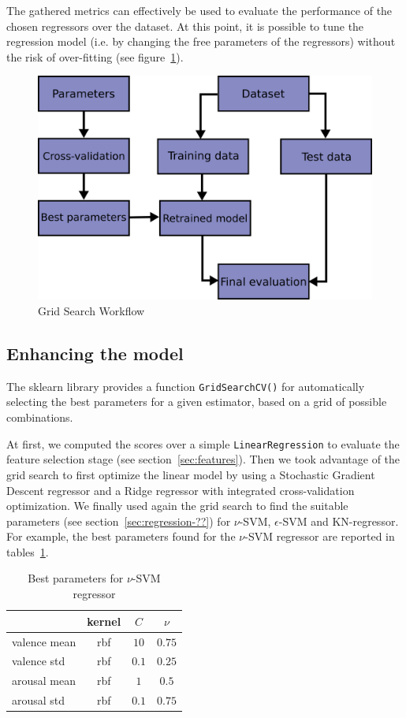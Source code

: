 The gathered metrics can effectively be used to evaluate the performance of the chosen regressors over the dataset.
At this point, it is possible to tune the regression model (i.e. by changing the free parameters of the regressors) without the risk of over-fitting (see figure~\ref{fig:grid-search-workflow}).

\begin{figure}
	\centering
	\includegraphics[width=0.5\linewidth]{assets/grid_search_workflow.png}
	\caption{Grid Search Workflow \cite{sklearn-crossval}}
	\label{fig:grid-search-workflow}
\end{figure}


\subsection{Enhancing the model}\label{sec:enhance-model}

The sklearn library provides a function \texttt{GridSearchCV()} for automatically selecting the best parameters for a given estimator, based on a grid of possible combinations.

At first, we computed the scores over a simple \texttt{LinearRegression} to evaluate the feature selection stage (see section~\ref{sec:features}).
Then we took advantage of the grid search to first optimize the linear model by using a Stochastic Gradient Descent regressor and a Ridge regressor with integrated cross-validation optimization.
We finally used again the grid search to find the suitable parameters (see section~\ref{sec:regression-??}) for $\nu$-SVM, $\epsilon$-SVM and KN-regressor.
For example, the best parameters found for the $\nu$-SVM regressor are reported in tables~\ref{table:cross-params-svr}.

\begin{table}
	\centering
	\begin{tabular}{lccc}
		\toprule
		& kernel & $C$ & $\nu$ \\
		\midrule
		valence mean & rbf & $10$ & $0.75$ \\
		valence std & rbf & $0.1$ & $0.25$ \\
		arousal mean & rbf & $1$ & $0.5$ \\
		arousal std & rbf & $0.1$ & $0.75$ \\
		\bottomrule
	\end{tabular}
	\caption{Best parameters for $\nu$-SVM regressor}
	\label{table:cross-params-svr}
\end{table}

